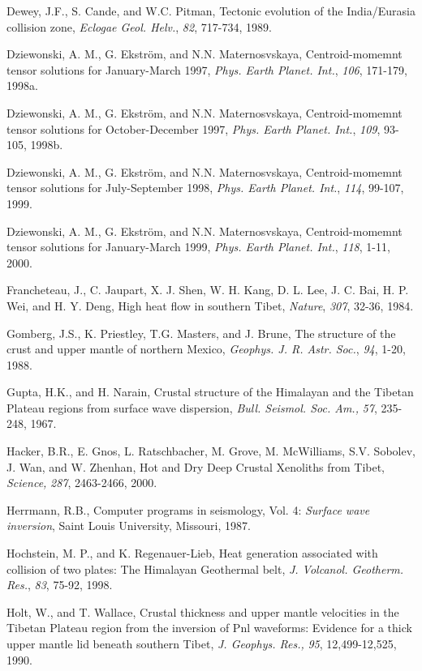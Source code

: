 \documentclass[12pt]{article}
\begin{document}
\begin{references}
Dewey, J.F., S. Cande, and W.C. Pitman, Tectonic evolution of the India/Eurasia
collision zone, {\it Eclogae Geol. Helv.}, {\it 82}, 717-734, 1989.


Dziewonski, A. M., G. Ekstr\"om, and N.N. Maternosvskaya,
Centroid-momemnt tensor solutions for January-March 1997, {\it
Phys. Earth Planet. Int.}, {\it 106}, 171-179, 1998a.

Dziewonski, A. M., G. Ekstr\"om, and N.N. Maternosvskaya,
Centroid-momemnt tensor solutions for October-December 1997, {\it
Phys. Earth Planet. Int.}, {\it 109}, 93-105, 1998b.

Dziewonski, A. M., G. Ekstr\"om, and N.N. Maternosvskaya,
Centroid-momemnt tensor solutions for July-September 1998, {\it
Phys. Earth Planet. Int.}, {\it 114}, 99-107, 1999.

Dziewonski, A. M., G. Ekstr\"om, and N.N. Maternosvskaya,
Centroid-momemnt tensor solutions for January-March 1999, {\it
Phys. Earth Planet. Int.}, {\it 118}, 1-11, 2000.



Francheteau, J., C. Jaupart, X. J. Shen, W. H. Kang, D. L. Lee,
J. C. Bai, H. P. Wei, and H. Y. Deng, High heat flow in southern
Tibet, {\it Nature}, {\it 307}, 32-36, 1984.

Gomberg, J.S., K. Priestley, T.G. Masters, and J. Brune, The structure of the crust 
and upper mantle of northern
Mexico, {\it Geophys. J. R. Astr. Soc.}, {\it 94}, 1-20, 1988.

Gupta, H.K., and H. Narain, Crustal structure of the Himalayan and
the Tibetan Plateau regions from surface wave dispersion, {\it Bull. Seismol.
Soc. Am.,} {\it 57}, 235-248, 1967.

Hacker, B.R., E. Gnos, L. Ratschbacher, M. Grove, M. McWilliams, S.V. Sobolev,
J. Wan, and W. Zhenhan, Hot and Dry Deep Crustal Xenoliths from Tibet,
{\it Science,} {\it 287}, 2463-2466, 2000.

Herrmann, R.B., Computer programs in seismology, Vol. 4: 
{\it Surface wave inversion}, Saint Louis University, Missouri, 1987.

Hochstein, M. P., and K. Regenauer-Lieb, Heat generation associated
with collision of two plates: The Himalayan Geothermal belt, {\it
J. Volcanol. Geotherm. Res.}, {\it 83}, 75-92, 1998.

Holt, W., and T. Wallace, Crustal thickness and upper mantle velocities
in the Tibetan Plateau region from the inversion of Pnl waveforms: Evidence
for a thick upper mantle lid beneath southern Tibet, {\it J. Geophys. Res.,} 
{\it 95}, 12,499-12,525, 1990.


\end{references}
\end{document}
